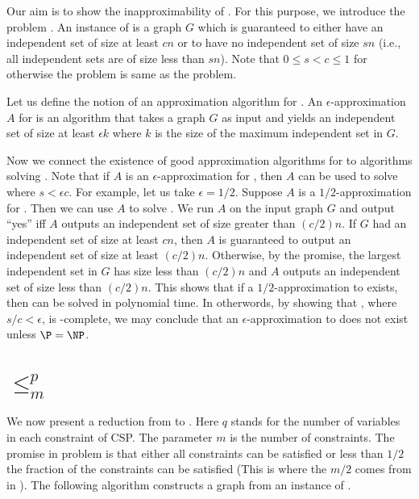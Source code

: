 

Our aim is to show the inapproximability of . For this 
purpose, we introduce the problem . An instance 
of  is a graph $G$ which is guaranteed to either 
have an independent set of size at least $cn$ or to have no independent 
set of size $sn$ (i.e., all independent sets are of size less than $sn$). 
Note that $0 \leq s < c \leq 1$ 
for otherwise the problem is same as the  problem. 

Let us define the notion of an approximation algorithm for . 
An $\epsilon$-approximation $A$ for  is an algorithm that 
takes a graph $G$ as input and yields an independent set of size at least 
$\epsilon k$ where $k$ is the size  of the maximum independent set in $G$. 

Now we connect the existence of good approximation algorithms for 
 to algorithms solving . Note that if 
$A$ is an $\epsilon$-approximation for , then $A$ can be 
used to solve  where $s < \epsilon c$. For example, let 
us take $\epsilon = 1/2$. Suppose $A$ is a $1/2$-approximation for 
. Then we can use $A$ to solve . We 
run $A$ on the input graph $G$ and output ``yes'' iff $A$ outputs an independent 
set of size greater than $(c/2)n$. If $G$ had an independent set of size at least 
$cn$, then $A$ is guaranteed to output an independent set of size at least $(c/2)n$. 
Otherwise, by the promise, the largest independent set in $G$ has size less than $(c/2)n$ 
and $A$ outputs an independent set of size less than $(c/2)n$. This shows that if a 
$1/2$-approximation to  exists, then  can be solved in 
polynomial time. In otherwords, by showing that , where $s/c < \epsilon$, 
is \NP-complete, we may conclude that an $\epsilon$-approximation to  does not 
exist unless $\P = \NP$.

\section{ $\leq_{m}^{p}$ }
We now present a reduction from  to . Here $q$ stands for the 
number of variables in each constraint of CSP. The parameter $m$ is the number of constraints. 
The promise in  problem is that either all constraints can be satisfied or less than 
$1/2$ the fraction of the constraints can be satisfied (This is where the $m/2$ comes from in ).
The following algorithm constructs a graph from an instance of .


